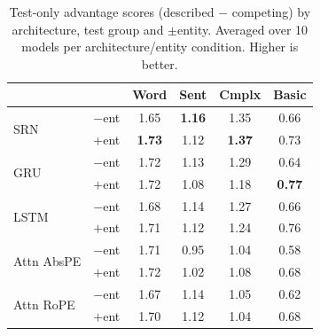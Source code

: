 \begin{table}[t]
\centering
\small
\begin{tabular}{@{}llcccc@{}}
\toprule
& & \textbf{Word} & \textbf{Sent} & \textbf{Cmplx} & \textbf{Basic} \\
\midrule
\multirow{2}{*}{SRN} & $-$ent & 1.65 & \textbf{1.16} & 1.35 & 0.66 \\
 & $+$ent & \textbf{1.73} & 1.12 & \textbf{1.37} & 0.73 \\
\midrule
\multirow{2}{*}{GRU} & $-$ent & 1.72 & 1.13 & 1.29 & 0.64 \\
 & $+$ent & 1.72 & 1.08 & 1.18 & \textbf{0.77} \\
\midrule
\multirow{2}{*}{LSTM} & $-$ent & 1.68 & 1.14 & 1.27 & 0.66 \\
 & $+$ent & 1.71 & 1.12 & 1.24 & 0.76 \\
\midrule
\multirow{2}{*}{Attn AbsPE} & $-$ent & 1.71 & 0.95 & 1.04 & 0.58 \\
 & $+$ent & 1.72 & 1.02 & 1.08 & 0.68 \\
\midrule
\multirow{2}{*}{Attn RoPE} & $-$ent & 1.67 & 1.14 & 1.05 & 0.62 \\
 & $+$ent & 1.70 & 1.12 & 1.04 & 0.68 \\
\bottomrule
\end{tabular}
\caption{\small Test-only advantage scores (described $-$ competing) by architecture, test group and $\pm$entity. Averaged over 10 models per architecture/entity condition. Higher is better.}
\label{tab:main_results_model}
\end{table}

